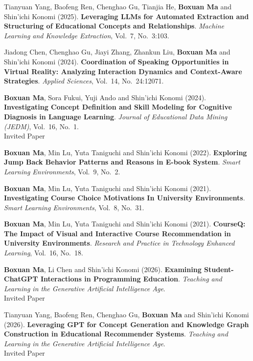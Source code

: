 \documentclass[a4paper,11pt]{article}
\begin{document}
\item[\textbf{[J.6]}] Tianyuan Yang, Baofeng Ren, Chenghao Gu, Tianjia He, \textbf{Boxuan Ma} and Shin'ichi Konomi (2025). \textbf{Leveraging LLMs for Automated Extraction and Structuring of Educational Concepts and Relationships}. \textit{Machine Learning and Knowledge Extraction}, Vol.~7, No.~3:103.
\item[\textbf{[J.5]}] Jiadong Chen, Chenghao Gu, Jiayi Zhang, Zhankun Liu, \textbf{Boxuan Ma} and Shin'ichi Konomi (2024). \textbf{Coordination of Speaking Opportunities in Virtual Reality: Analyzing Interaction Dynamics and Context-Aware Strategies}. \textit{Applied Sciences}, Vol.~14, No.~24:12071.
\item[\textbf{[J.4]}] \textbf{Boxuan Ma}, Sora Fukui, Yuji Ando and Shin'ichi Konomi (2024). \textbf{Investigating Concept Definition and Skill Modeling for Cognitive Diagnosis in Language Learning}. \textit{Journal of Educational Data Mining (JEDM)}, Vol.~16, No.~1. \\ \textcolor{red!80!black}{Invited Paper}
\item[\textbf{[J.3]}] \textbf{Boxuan Ma}, Min Lu, Yuta Taniguchi and Shin'ichi Konomi (2022). \textbf{Exploring Jump Back Behavior Patterns and Reasons in E-book System}. \textit{Smart Learning Environments}, Vol.~9, No.~2.
\item[\textbf{[J.2]}] \textbf{Boxuan Ma}, Min Lu, Yuta Taniguchi and Shin'ichi Konomi (2021). \textbf{Investigating Course Choice Motivations In University Environments}. \textit{Smart Learning Environments}, Vol.~8, No.~31.
\item[\textbf{[J.1]}] \textbf{Boxuan Ma}, Min Lu, Yuta Taniguchi and Shin'ichi Konomi (2021). \textbf{CourseQ: The Impact of Visual and Interactive Course Recommendation in University Environments}. \textit{Research and Practice in Technology Enhanced Learning}, Vol.~16, No.~18.
\item[\textbf{[B.2]}] \textbf{Boxuan Ma}, Li Chen and Shin'ichi Konomi (2026). \textbf{Examining Student-ChatGPT Interactions in Programming Education}. \textit{Teaching and Learning in the Generative Artificial Intelligence Age}. \\ \textcolor{red!80!black}{Invited Paper}
\item[\textbf{[B.1]}] Tianyuan Yang, Baofeng Ren, Chenghao Gu, \textbf{Boxuan Ma} and Shin'ichi Konomi (2026). \textbf{Leveraging GPT for Concept Generation and Knowledge Graph Construction in Educational Recommender Systems}. \textit{Teaching and Learning in the Generative Artificial Intelligence Age}. \\ \textcolor{red!80!black}{Invited Paper}
\end{document}
